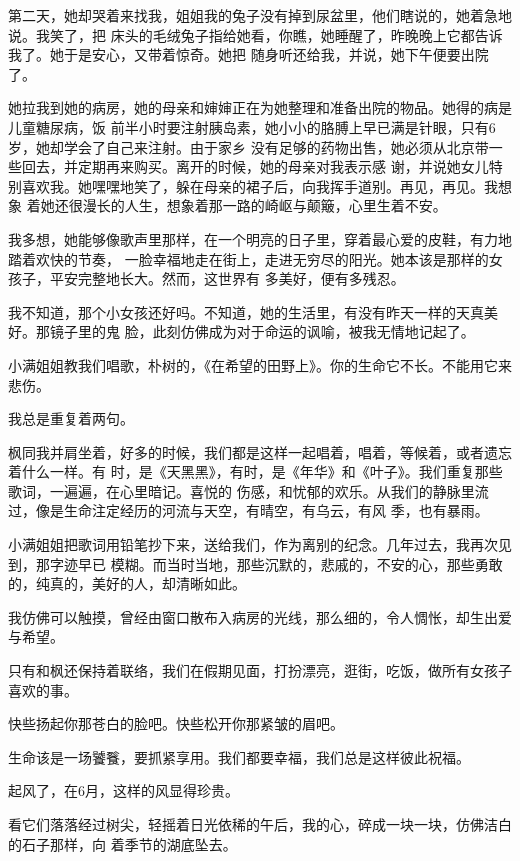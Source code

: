 		第二天，她却哭着来找我，姐姐我的兔子没有掉到尿盆里，他们瞎说的，她着急地说。我笑了，把
	床头的毛绒兔子指给她看，你瞧，她睡醒了，昨晚晚上它都告诉我了。她于是安心，又带着惊奇。她把
	随身听还给我，并说，她下午便要出院了。


		她拉我到她的病房，她的母亲和婶婶正在为她整理和准备出院的物品。她得的病是儿童糖尿病，饭
	前半小时要注射胰岛素，她小小的胳膊上早已满是针眼，只有6岁，她却学会了自己来注射。由于家乡
	没有足够的药物出售，她必须从北京带一些回去，并定期再来购买。离开的时候，她的母亲对我表示感
	谢，并说她女儿特别喜欢我。她嘿嘿地笑了，躲在母亲的裙子后，向我挥手道别。再见，再见。我想象
	着她还很漫长的人生，想象着那一路的崎岖与颠簸，心里生着不安。


		我多想，她能够像歌声里那样，在一个明亮的日子里，穿着最心爱的皮鞋，有力地踏着欢快的节奏，
	一脸幸福地走在街上，走进无穷尽的阳光。她本该是那样的女孩子，平安完整地长大。然而，这世界有
	多美好，便有多残忍。


		我不知道，那个小女孩还好吗。不知道，她的生活里，有没有昨天一样的天真美好。那镜子里的鬼
	脸，此刻仿佛成为对于命运的讽喻，被我无情地记起了。


		小满姐姐教我们唱歌，朴树的，《在希望的田野上》。你的生命它不长。不能用它来悲伤。

		我总是重复着两句。

		枫同我并肩坐着，好多的时候，我们都是这样一起唱着，唱着，等候着，或者遗忘着什么一样。有
	时，是《天黑黑》，有时，是《年华》和《叶子》。我们重复那些歌词，一遍遍，在心里暗记。喜悦的
	伤感，和忧郁的欢乐。从我们的静脉里流过，像是生命注定经历的河流与天空，有晴空，有乌云，有风
	季，也有暴雨。

		小满姐姐把歌词用铅笔抄下来，送给我们，作为离别的纪念。几年过去，我再次见到，那字迹早已
	模糊。而当时当地，那些沉默的，悲戚的，不安的心，那些勇敢的，纯真的，美好的人，却清晰如此。


		我仿佛可以触摸，曾经由窗口散布入病房的光线，那么细的，令人惆怅，却生出爱与希望。


		只有和枫还保持着联络，我们在假期见面，打扮漂亮，逛街，吃饭，做所有女孩子喜欢的事。\par
		快些扬起你那苍白的脸吧。快些松开你那紧皱的眉吧。\par
		生命该是一场饕餮，要抓紧享用。我们都要幸福，我们总是这样彼此祝福。

	\endwriting



		起风了，在6月，这样的风显得珍贵。

		看它们落落经过树尖，轻摇着日光依稀的午后，我的心，碎成一块一块，仿佛洁白的石子那样，向
	着季节的湖底坠去。


